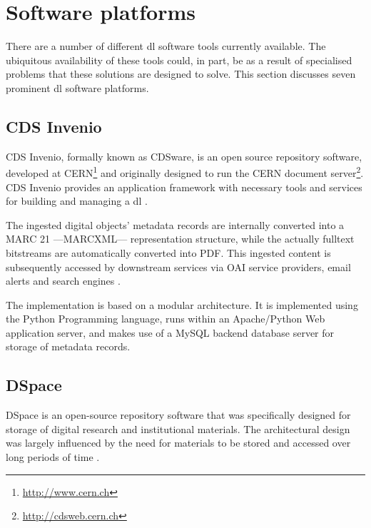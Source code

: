 \section[Software platforms]{Software platforms}
\label{sec:background:digital-libraries-software}

There are a number of different \gls{dl} software tools currently available. The ubiquitous availability of these tools could, in part, be as a result of specialised problems that these solutions are designed to solve. This section discusses seven prominent \gls{dl} software platforms.

\subsection{CDS Invenio}

CDS Invenio, formally known as CDSware, is an open source repository software, developed at CERN\footnote{\url{http://www.cern.ch}} and originally designed to run the CERN document server\footnote{\url{http://cdsweb.cern.ch}}. CDS Invenio provides an application framework with necessary tools and services for building and managing a \gls{dl} \citep{Vesely2004}.

The ingested digital objects' metadata records are internally converted into a MARC 21 ---MARCXML--- representation structure, while the actually fulltext bitstreams are automatically converted into PDF. This ingested content is subsequently accessed by downstream services via OAI service providers, email alerts and search engines \citep{Pepe2005}.

The implementation is based on a modular architecture. It is implemented using the Python Programming language, runs within an Apache/Python Web application server, and makes use of a MySQL backend database server for storage of metadata records.

\subsection{DSpace}

DSpace is an open-source repository software that was specifically designed for storage of digital research and institutional materials. The architectural design was largely influenced by the need for materials to be stored and accessed over long periods of time \citep{Transley2003}.

